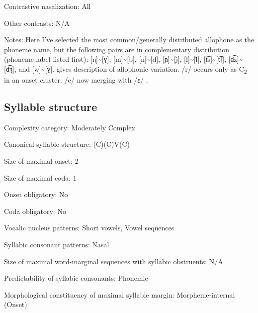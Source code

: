 {\begin{appendixdesc}
\item[Contrastive nasalization:] All

\item[Other contrasts:] N/A

\item[Notes:] Here I’ve selected the most common/generally distributed allophone as the phoneme name, but the following pairs are in complementary distribution (phoneme label listed first): [ŋ]{\textasciitilde}[ɣ], [m]{\textasciitilde}[b], [n]{\textasciitilde}[d], [ɲ]{\textasciitilde}[j], [l]{\textasciitilde}[\~{l}], [t͡s]{\textasciitilde}[t͡ʃ], [d͡z]{\textasciitilde}[d͡ʒ], and [w]{\textasciitilde}[ɣ]. \citet[10--18]{Duthie1996} gives description of allophonic variation. /r/ occurs only as C\textsubscript{2} in an onset cluster. /e/ now merging with /ɛ/ \citep[19]{Duthie1996}.
\end{appendixdesc}
\subsection*{Syllable structure}
\begin{appendixdesc}

\item[Complexity category:] Moderately Complex

\item[Canonical syllable structure:] (C)(C)V(C) \citep[38--39]{Ameka1991}

\item[Size of maximal onset:] 2

\item[Size of maximal coda:] 1

\item[Onset obligatory:] No

\item[Coda obligatory:] No

\item[Vocalic nucleus patterns:] Short vowels, Vowel sequences

\item[Syllabic consonant patterns:] Nasal

\item[Size of maximal word-marginal sequences with syllabic obstruents:] N/A

\item[Predictability of syllabic consonants:] Phonemic

\item[Morphological constituency of maximal syllable margin:] Morpheme-internal (Onset)


\end{appendixdesc}}
